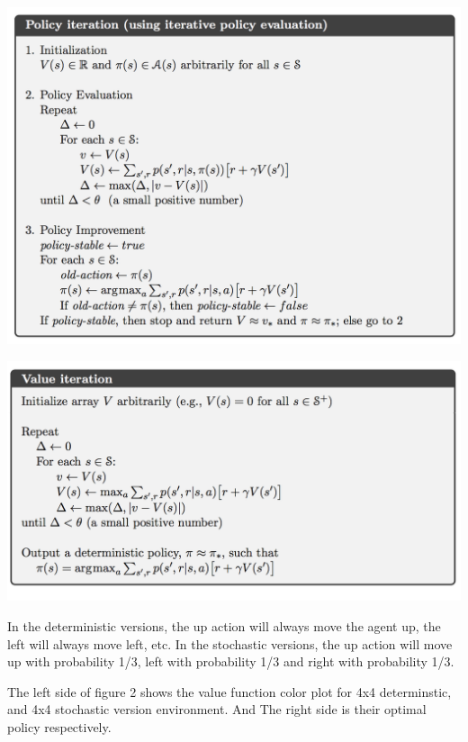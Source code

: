 \documentclass[12pt,a4paper]{report}
\begin{document}
\includegraphics[scale=0.5]{algorithm}
\vspace{0.1cm}

\includegraphics[scale=0.5]{algorithm2}

In the deterministic versions, the up action will always move the agent up, the left will always move left, etc. In the stochastic versions, the up action will move up with probability 1/3, left with probability 1/3 and right with probability 1/3.

The left side of figure 2 shows the value function color plot for 4x4 determinstic, and 4x4 stochastic version environment. And The right side is their optimal policy respectively.
\end{document}
